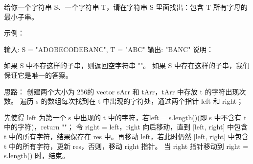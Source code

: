 给你一个字符串 S、一个字符串 T，请在字符串 S 里面找出：包含 T 所有字母的最小子串。

示例：

输入: S = "ADOBECODEBANC", T = "ABC"
输出: "BANC"
说明：

如果 S 中不存这样的子串，则返回空字符串 ""。
如果 S 中存在这样的子串，我们保证它是唯一的答案。
































思路：
创建两个大小为 256的 vector sArr 和 tArr，tArr 中存放 t 的字符出现次数。
遍历 s 的数组每次找到在 t 中出现的字符处，通过两个指针 left 和 right；

先使得 left 为第一个 s 中出现的 t 中的字符，若left = s.length()(即 s 中不含有 t 中的字符)，return ""；
令 right = left，right 向后移动，直到 [left, right] 中包含 t 中的所有字符，结果保存在 res 中。再移动 left，若此时仍然 [left, right] 中包含 t 中的所有字符，更新 res，否则，移动 right 指针。
当 right 指针移动到 right = s.length() 时，结束。

































